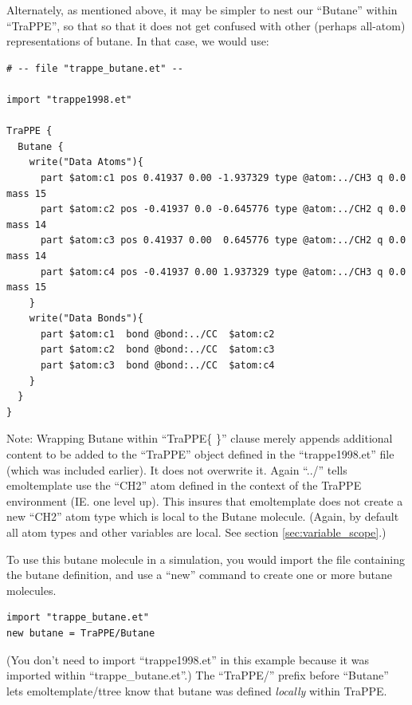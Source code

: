 \documentclass[11pt]{article}
\begin{document}

Alternately, as mentioned above, it may be simpler to nest our ``Butane'' 
within ``TraPPE'', so that so that it does not get confused with other
(perhaps all-atom) representations of butane.  In that case, we would use:
\begin{verbatim}
# -- file "trappe_butane.et" --

import "trappe1998.et"

TraPPE {
  Butane {
    write("Data Atoms"){
      part $atom:c1 pos 0.41937 0.00 -1.937329 type @atom:../CH3 q 0.0 mass 15
      part $atom:c2 pos -0.41937 0.0 -0.645776 type @atom:../CH2 q 0.0 mass 14
      part $atom:c3 pos 0.41937 0.00  0.645776 type @atom:../CH2 q 0.0 mass 14
      part $atom:c4 pos -0.41937 0.00 1.937329 type @atom:../CH3 q 0.0 mass 15
    }
    write("Data Bonds"){
      part $atom:c1  bond @bond:../CC  $atom:c2
      part $atom:c2  bond @bond:../CC  $atom:c3
      part $atom:c3  bond @bond:../CC  $atom:c4
    }
  }
}
\end{verbatim}
Note: Wrapping Butane within ``TraPPE\{ \}'' clause merely appends 
additional content to be added to the ``TraPPE'' object defined 
in the ``trappe1998.et'' file (which was included earlier). 
It does not overwrite it. 
Again ``../'' tells emoltemplate use the ``CH2'' atom 
defined in the context of the TraPPE environment (IE. one level up).
This insures that emoltemplate does not create a new ``CH2'' atom type
which is local to the Butane molecule.  
(Again, by default all atom types and other variables are local.
See section \ref{sec:variable_scope}.)

To use this butane molecule in a simulation, 
you would import the file containing the butane definition,
and use a ``new'' command to create one or more butane molecules.
\begin{verbatim}
import "trappe_butane.et"
new butane = TraPPE/Butane
\end{verbatim}
(You don't need to import ``trappe1998.et'' in this example because
it was imported within ``trappe\_butane.et''.)
The ``TraPPE/'' prefix before ``Butane'' lets emoltemplate/ttree
know that butane was defined \textit{locally} within TraPPE.  
\end{document}

